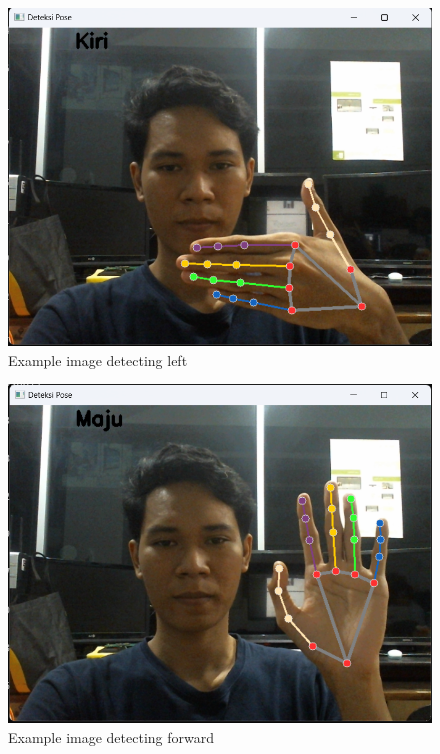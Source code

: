 \begin{figure} [h] \centering
  \includegraphics[scale=0.48]{gambar/bab3/Kiri.png}
  \caption{Example image detecting left}
  \label{fig:klasifikasi kiri}
\end{figure}

\begin{figure} [h] \centering
  \includegraphics[scale=0.48]{gambar/bab3/Maju.png}
  \caption{Example image detecting forward}
  \label{fig:klasifikasi maju}
\end{figure}

